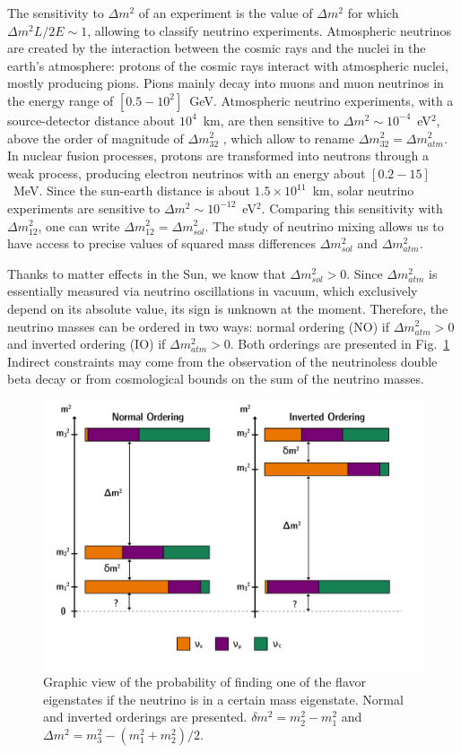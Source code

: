 The sensitivity to $\Delta m^2$ of an experiment is the value of $\Delta m^2$ for which ${\Delta m^2 L/2E \sim 1}$, allowing to classify neutrino experiments.
Atmospheric neutrinos are created by the interaction between the cosmic rays and the nuclei in the earth's atmosphere: protons of the cosmic rays interact with atmospheric nuclei, mostly producing pions.
Pions mainly decay into muons and muon neutrinos in the energy range of $[0.5-10^2]$~GeV.
Atmospheric neutrino experiments, with a source-detector distance about $10^4$~km, are then sensitive to $\Delta m^2\sim 10^{-4}$~eV$^2$, above the order of magnitude of $\Delta m^2_{32}$ , which allow to rename $\Delta m^2_{32} = \Delta m^2_{atm}$.
In nuclear fusion processes, protons are transformed into neutrons through a weak process, producing electron neutrinos with an energy about $[0.2-15]$~MeV.
Since the sun-earth distance is about $1.5\times 10^{11}$~km, solar neutrino experiments are sensitive to $\Delta m^2 \sim 10^{-12}$~eV$^2$.
Comparing this sensitivity with $\Delta m^2_{12}$, one can write $\Delta m^2_{12} = \Delta m^2_{sol}$.
The study of neutrino mixing allows us to have access to precise values of squared mass differences $\Delta m^2_{sol}$ and $\Delta m^2_{atm}$.

Thanks to matter effects in the Sun, we know that $\Delta m^2_{sol}>0$.
Since $\Delta m^2_{atm}$ is essentially measured via neutrino oscillations in vacuum, which exclusively depend on its absolute value, its sign is unknown at the moment.
Therefore, the neutrino masses can be ordered in two ways: normal ordering (NO) if $\Delta m^2_{atm}>0$ and inverted ordering (IO) if $\Delta m^2_{atm}>0$.
Both orderings are presented in Fig.~\ref{fig:IO_NO}
Indirect constraints may come from the observation of the neutrinoless double beta decay or from cosmological bounds on the sum of the neutrino masses.
\begin{figure}[h!]
  \centering
  \includegraphics[width=1\textwidth]{neutrinophysics/fig_neutrinophysics/IO_NO.pdf}
  \caption{Graphic view of the probability of finding one of the flavor eigenstates if the neutrino is in a certain mass eigenstate.
    Normal and inverted orderings are presented.
    ${\delta m^2=m_2^2-m_1^2}$ and ${\Delta m^2=m_3^2-(m_1^2+m_2^2)/2}$.
    \label{fig:IO_NO}}
\end{figure}

